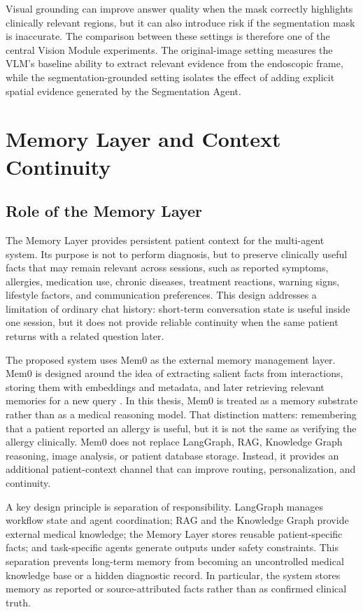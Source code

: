 Visual grounding can improve answer quality when the mask correctly highlights clinically relevant regions, but it can also introduce risk if the segmentation mask is inaccurate. The comparison between these settings is therefore one of the central Vision Module experiments. The original-image setting measures the VLM's baseline ability to extract relevant evidence from the endoscopic frame, while the segmentation-grounded setting isolates the effect of adding explicit spatial evidence generated by the Segmentation Agent.


\section{Memory Layer and Context Continuity}

\subsection{Role of the Memory Layer}

The Memory Layer provides persistent patient context for the multi-agent system. Its purpose is not to perform diagnosis, but to preserve clinically useful facts that may remain relevant across sessions, such as reported symptoms, allergies, medication use, chronic diseases, treatment reactions, warning signs, lifestyle factors, and communication preferences. This design addresses a limitation of ordinary chat history: short-term conversation state is useful inside one session, but it does not provide reliable continuity when the same patient returns with a related question later.

The proposed system uses Mem0 as the external memory management layer. Mem0 is designed around the idea of extracting salient facts from interactions, storing them with embeddings and metadata, and later retrieving relevant memories for a new query \cite{mem0_paper,mem0_docs_overview}. In this thesis, Mem0 is treated as a memory substrate rather than as a medical reasoning model. That distinction matters: remembering that a patient reported an allergy is useful, but it is not the same as verifying the allergy clinically. Mem0 does not replace LangGraph, RAG, Knowledge Graph reasoning, image analysis, or patient database storage. Instead, it provides an additional patient-context channel that can improve routing, personalization, and continuity.

A key design principle is separation of responsibility. LangGraph manages workflow state and agent coordination; RAG and the Knowledge Graph provide external medical knowledge; the Memory Layer stores reusable patient-specific facts; and task-specific agents generate outputs under safety constraints. This separation prevents long-term memory from becoming an uncontrolled medical knowledge base or a hidden diagnostic record. In particular, the system stores memory as reported or source-attributed facts rather than as confirmed clinical truth.

